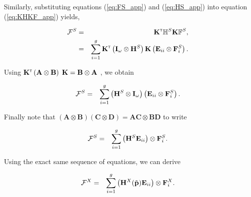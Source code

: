 \documentclass[11pt]{article}
\def\mbf#1{\mathbf{#1}}
\def\mbb#1{\mathbb{#1}}
\def\mcal#1{\mathcal{#1}}
\newcommand{\bo}[1]{{\bf #1}}
\newcommand{\tr}{{\mbox{\tiny \sf T}}}
\newcommand{\om}{\omega}
\newcommand{\kron}{\otimes}
\begin{document}
Similarly, substituting equations (\ref{eq:FS_app}) and (\ref{eq:HS_app}) into equation (\ref{eq:KHKF_app}) yields,
\begin{linenomath*}
\begin{eqnarray}
\mcal{F}^S &=&\bo K^\tr \mbb{H}^S\bo K \mathbb{F}^S, \label{eq:KHKF_app}\\
 &=& \sum_{i=1}^g \bo K^\tr \left( \bo I_\om \kron \bo H^S \right)  \bo K \left( \mathbf{E}_{ii} \otimes \mathbf{F}^S_{i} \right).
\end{eqnarray}
\end{linenomath*}
Using $\bo K^\tr \left(\bo A \otimes \bo B  \right) \; \bo K=\bo B \otimes \bo A$ \citep{magnus1979commutation}, we obtain
\begin{linenomath*}
\begin{eqnarray}
\mcal{F}^S  &=& \sum_{i=1}^g  \left(  \bo H^S  \kron \bo I_\om\right) \left( \mathbf{E}_{ii} \otimes \mathbf{F}^S_{i} \right).
\end{eqnarray}
\end{linenomath*}
Finally note that $(\mathbf{A} \otimes \mathbf{B}) (\mathbf{C} \otimes \mathbf{D}) = \mathbf{A} \mathbf{C}\otimes \mathbf{B} \mathbf{D}$  to write
\begin{linenomath*}
\begin{eqnarray}
\mcal{F}^S  &=& \sum_{i=1}^g  \left(  \bo H^S \mathbf{E}_{ii} \right) \kron  \mathbf{F}^S_{i} .
\end{eqnarray}
\end{linenomath*}
Using the exact same sequence of equations, we can derive
\begin{linenomath*}
\begin{eqnarray}
\mcal{F}^X  &=& \sum_{i=1}^g  \left(  \bo H^X(\tilde{\mbf{p}}) \mathbf{E}_{ii} \right) \kron  \mathbf{F}^X_{i} .
\end{eqnarray}
\end{linenomath*}
\end{document}
